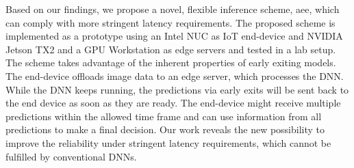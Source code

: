 \begin{justify}
\begin{small}
{{				Based on our findings, we propose a novel, flexible inference scheme, \acrfull{aee}, which can comply with more stringent latency requirements. The proposed scheme is implemented as a prototype using an Intel NUC as IoT end-device and NVIDIA Jetson TX2 and a GPU Workstation as edge servers and tested in a lab setup. The scheme takes advantage of the inherent properties of early exiting models. The end-device offloads image data to an edge server, which processes the DNN. While the DNN keeps running, the predictions via early exits will be sent back to the end device as soon as they are ready. The end-device might receive multiple predictions within the allowed time frame and can use information from all predictions to make a final decision. Our work reveals the new possibility to improve the reliability under stringent latency requirements, which cannot be fulfilled by conventional DNNs.
		}}
	\end{small}
\end{justify}